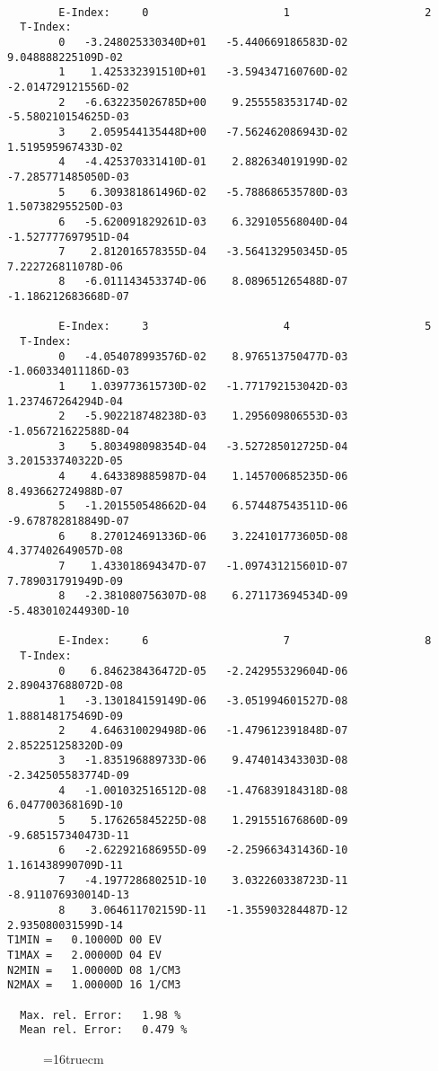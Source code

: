 \documentclass[12pt,dvipdfmx]{article}
\begin{document}
\begin{small}\begin{verbatim}

        E-Index:     0                     1                     2
  T-Index:
        0   -3.248025330340D+01   -5.440669186583D-02    9.048888225109D-02
        1    1.425332391510D+01   -3.594347160760D-02   -2.014729121556D-02
        2   -6.632235026785D+00    9.255558353174D-02   -5.580210154625D-03
        3    2.059544135448D+00   -7.562462086943D-02    1.519595967433D-02
        4   -4.425370331410D-01    2.882634019199D-02   -7.285771485050D-03
        5    6.309381861496D-02   -5.788686535780D-03    1.507382955250D-03
        6   -5.620091829261D-03    6.329105568040D-04   -1.527777697951D-04
        7    2.812016578355D-04   -3.564132950345D-05    7.222726811078D-06
        8   -6.011143453374D-06    8.089651265488D-07   -1.186212683668D-07

        E-Index:     3                     4                     5
  T-Index:
        0   -4.054078993576D-02    8.976513750477D-03   -1.060334011186D-03
        1    1.039773615730D-02   -1.771792153042D-03    1.237467264294D-04
        2   -5.902218748238D-03    1.295609806553D-03   -1.056721622588D-04
        3    5.803498098354D-04   -3.527285012725D-04    3.201533740322D-05
        4    4.643389885987D-04    1.145700685235D-06    8.493662724988D-07
        5   -1.201550548662D-04    6.574487543511D-06   -9.678782818849D-07
        6    8.270124691336D-06    3.224101773605D-08    4.377402649057D-08
        7    1.433018694347D-07   -1.097431215601D-07    7.789031791949D-09
        8   -2.381080756307D-08    6.271173694534D-09   -5.483010244930D-10

        E-Index:     6                     7                     8
  T-Index:
        0    6.846238436472D-05   -2.242955329604D-06    2.890437688072D-08
        1   -3.130184159149D-06   -3.051994601527D-08    1.888148175469D-09
        2    4.646310029498D-06   -1.479612391848D-07    2.852251258320D-09
        3   -1.835196889733D-06    9.474014343303D-08   -2.342505583774D-09
        4   -1.001032516512D-08   -1.476839184318D-08    6.047700368169D-10
        5    5.176265845225D-08    1.291551676860D-09   -9.685157340473D-11
        6   -2.622921686955D-09   -2.259663431436D-10    1.161438990709D-11
        7   -4.197728680251D-10    3.032260338723D-11   -8.911076930014D-13
        8    3.064611702159D-11   -1.355903284487D-12    2.935080031599D-14
T1MIN =   0.10000D 00 EV
T1MAX =   2.00000D 04 EV
N2MIN =   1.00000D 08 1/CM3
N2MAX =   1.00000D 16 1/CM3

  Max. rel. Error:   1.98 %
  Mean rel. Error:   0.479 %

\end{verbatim}\end{small}
\begin{figure} \label{H4-2.1.5FU}
\epsfxsize=16truecm
\end{figure}
\newpage
\end{document}
